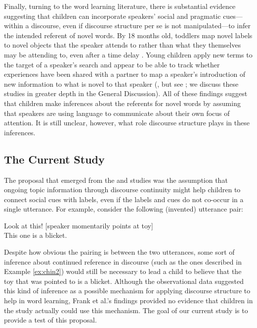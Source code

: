 \documentclass[man]{apa2}
\begin{document}
Finally, turning to the word learning literature, there is substantial evidence suggesting that children can incorporate speakers' social and pragmatic cues---within a discourse, even if discourse structure per se is not manipulated---to infer the intended referent of novel words. By 18 months old, toddlers map novel labels to novel objects that the speaker attends to rather than what they themselves may be attending to, even after a time delay \cite{baldwin1991,baldwin1993}.  Young children apply new terms to the target of a speaker's search \cite{tomasello1994} and appear to be able to track whether experiences have been shared with a partner to map a speaker's introduction of new information to what is novel to that speaker (, but see ; we discuss these studies in greater depth in the General Discussion).  All of these findings suggest that children make inferences about the referents for novel words by assuming that speakers are using language to communicate about their own focus of attention.  It is still unclear, however, what role discourse structure plays in these inferences.  

\subsection{The Current Study}

The proposal that emerged from the  and  studies was the assumption that ongoing topic information through discourse continuity might help children to connect social cues with labels, even if the labels and cues do not co-occur in a single utterance.  For example, consider the following (invented) utterance pair:

\begin{example}
\label{ex:blicket}
Look at this! [speaker momentarily points at toy] \\
This one is a blicket.
\end{example}

\noindent Despite how obvious the pairing is between the two utterances, some sort of inference about continued reference in discourse (such as the ones described in Example \ref{ex:chin2}) would still be necessary to lead a child to believe that the toy that was pointed to is a blicket.  Although the observational data suggested this kind of inference as a possible mechanism for applying discourse structure to help in word learning, Frank et al.'s findings provided no evidence that children in the study actually could use this mechanism.  The goal of our current study is to provide a test of this proposal. 
\end{document}
